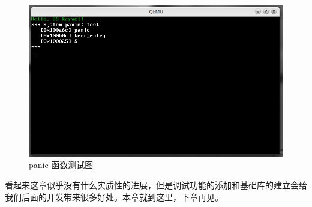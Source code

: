 \begin{figure}[ht]
      \centering
      \includegraphics[scale=0.5]{picture/chapt5/os_panic.png}
      \caption{panic 函数测试图}
\end{figure}

\par 看起来这章似乎没有什么实质性的进展，但是调试功能的添加和基础库的建立会给我们后面的开发带来很多好处。本章就到这里，下章再见。
